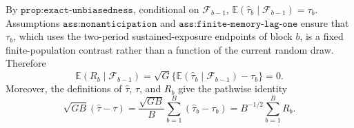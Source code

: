 By \(\texttt{prop:exact-unbiasedness}\), conditional on \(\mathcal F_{b-1}\), \(\mathbb E(\widehat\tau_b\mid\mathcal F_{b-1})=\tau_b\).  Assumptions \(\texttt{ass:nonanticipation}\) and \(\texttt{ass:finite-memory-lag-one}\) ensure that \(\tau_b\), which uses the two-period sustained-exposure endpoints of block \(b\), is a fixed finite-population contrast rather than a function of the current random draw.  Therefore
\[
 \mathbb E(R_b\mid\mathcal F_{b-1})
 =\sqrt G\{\mathbb E(\widehat\tau_b\mid\mathcal F_{b-1})-\tau_b\}=0.
\]
Moreover, the definitions of \(\widehat\tau\), \(\tau\), and \(R_b\) give the pathwise identity
\[
 \sqrt{GB}(\widehat\tau-\tau)
 =\frac{\sqrt{GB}}B\sum_{b=1}^B(\widehat\tau_b-\tau_b)
 =B^{-1/2}\sum_{b=1}^BR_b.
\]